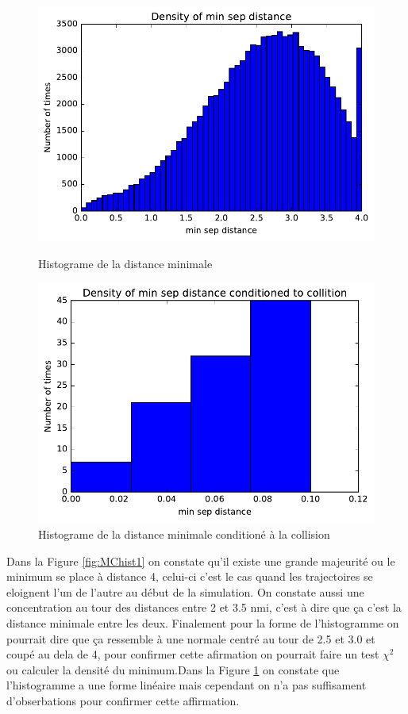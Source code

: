 \documentclass[a4paper, 12pt,twoside]{article}
\numberwithin{equation}{subsection}
\newlength{\mylength}
\begin{document}
	\begin{figure}[htbp]
		\centering
		\begin{minipage}[b]{\mylength}
			\includegraphics[width=\textwidth]{Images/Script_5_4}
			\caption{Histograme de la distance minimale}
			\label{fig:MChist1}
		\end{minipage}
		\hfill
		\begin{minipage}[b]{\mylength}
			\includegraphics[width=\textwidth]{Images/Script_5_3}
			\caption{Histograme de la distance minimale conditioné à la collision}
			\label{fig:MChist2}
		\end{minipage}
	\end{figure}
	
	Dans la Figure \ref{fig:MChist1} on constate qu'il existe une grande majeurité ou le minimum se place à distance 4, celui-ci c'est le cas quand les trajectoires se eloignent l'un de l'autre au début de la simulation. On constate aussi une concentration au tour des distances entre 2 et 3.5 nmi, c'est à dire que ça c'est la distance minimale entre les deux. Finalement pour la forme de l'histogramme on pourrait dire que ça ressemble à une normale centré au tour de 2.5 et 3.0 et coupé au dela de 4, pour confirmer cette afirmation on pourrait faire un test $\chi^2$ ou  calculer la densité du minimum.Dans la Figure \ref{fig:MChist2} on constate que l'histogramme a une forme linéaire mais cependant on n'a pas suffisament d'obserbations pour confirmer cette affirmation.
	
\end{document}
